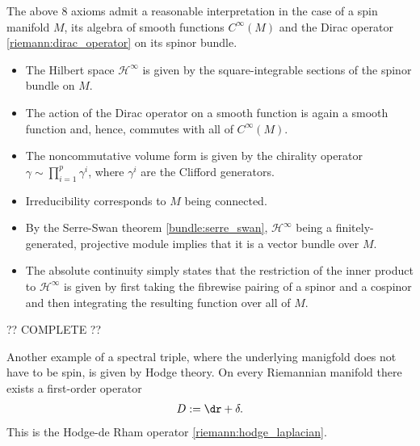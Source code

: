     \begin{example}
        The above 8 axioms admit a reasonable interpretation in the case of a spin manifold $M$, its algebra of smooth functions $C^\infty(M)$ and the Dirac operator \ref{riemann:dirac_operator} on its spinor bundle.
        \begin{itemize}
            \item The Hilbert space $\mathcal{H}^\infty$ is given by the square-integrable sections of the spinor bundle on $M$.
            \item The action of the Dirac operator on a smooth function is again a smooth function and, hence, commutes with all of $C^\infty(M)$.
            \item The noncommutative volume form is given by the chirality operator $\gamma\sim\prod_{i=1}^p\gamma^i$, where $\gamma^i$ are the Clifford generators.
            \item Irreducibility corresponds to $M$ being connected.
            \item By the Serre-Swan theorem \ref{bundle:serre_swan}, $\mathcal{H}^\infty$ being a finitely-generated, projective module implies that it is a vector bundle over $M$.
            \item The absolute continuity simply states that the restriction of the inner product to $\mathcal{H}^\infty$ is given by first taking the fibrewise pairing of a spinor and a cospinor and then integrating the resulting function over all of $M$.
        \end{itemize}
        ?? COMPLETE ??
    \end{example}
    \begin{example}
        Another example of a spectral triple, where the underlying manigfold does not have to be spin, is given by Hodge theory. On every Riemannian manifold there exists a first-order operator
        \begin{gather}
            D:=\dr+\delta.
        \end{gather}
        This is the Hodge-de Rham operator \ref{riemann:hodge_laplacian}.
    \end{example}

